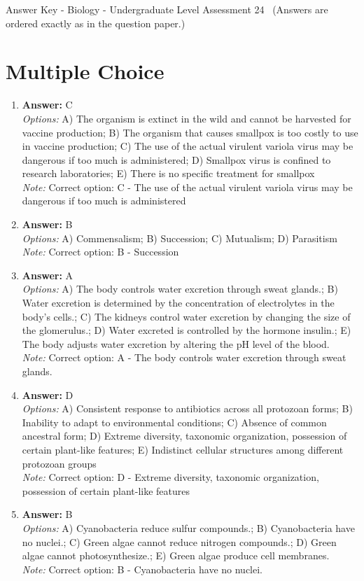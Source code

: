 \documentclass[12pt]{article}
\begin{document}
\begin{center}
Answer Key - Biology - Undergraduate Level Assessment 24 \
\small (Answers are ordered exactly as in the question paper.)
\end{center}

\section*{Multiple Choice}
\begin{enumerate}[label=\arabic*.]
\item \textbf{Answer:} C
\\ \textit{Options:} A) The organism is extinct in the wild and cannot be harvested for vaccine production; B) The organism that causes smallpox is too costly to use in vaccine production; C) The use of the actual virulent variola virus may be dangerous if too much is administered; D) Smallpox virus is confined to research laboratories; E) There is no specific treatment for smallpox
\\ \textit{Note:} Correct option: C - The use of the actual virulent variola virus may be dangerous if too much is administered
\item \textbf{Answer:} B
\\ \textit{Options:} A) Commensalism; B) Succession; C) Mutualism; D) Parasitism
\\ \textit{Note:} Correct option: B - Succession
\item \textbf{Answer:} A
\\ \textit{Options:} A) The body controls water excretion through sweat glands.; B) Water excretion is determined by the concentration of electrolytes in the body's cells.; C) The kidneys control water excretion by changing the size of the glomerulus.; D) Water excreted is controlled by the hormone insulin.; E) The body adjusts water excretion by altering the pH level of the blood.
\\ \textit{Note:} Correct option: A - The body controls water excretion through sweat glands.
\item \textbf{Answer:} D
\\ \textit{Options:} A) Consistent response to antibiotics across all protozoan forms; B) Inability to adapt to environmental conditions; C) Absence of common ancestral form; D) Extreme diversity, taxonomic organization, possession of certain plant-like features; E) Indistinct cellular structures among different protozoan groups
\\ \textit{Note:} Correct option: D - Extreme diversity, taxonomic organization, possession of certain plant-like features
\item \textbf{Answer:} B
\\ \textit{Options:} A) Cyanobacteria reduce sulfur compounds.; B) Cyanobacteria have no nuclei.; C) Green algae cannot reduce nitrogen compounds.; D) Green algae cannot photosynthesize.; E) Green algae produce cell membranes.
\\ \textit{Note:} Correct option: B - Cyanobacteria have no nuclei.
\end{enumerate}
\end{document}
